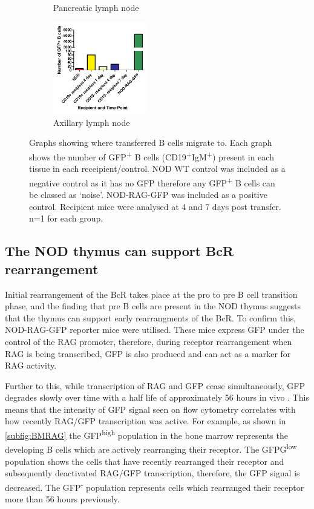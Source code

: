 \begin{figure}
\begin{subfigure}{0.45\textwidth}
	\caption{Pancreatic lymph node}
	\label{subfig:PLNGFPBcells}
	\end{subfigure}
	\begin{subfigure}{\textwidth}
	\centering
	\includegraphics[width=0.45\textwidth]{Figures/axLNGFPBcells.pdf}
	\caption{Axillary lymph node}
	\label{subfig:axLNGFPBcells}
	\end{subfigure}
\caption[Transferred B cells migrate preferentially to the spleen and thymus]{Graphs showing where transferred B cells migrate to.
Each graph shows the number of GFP\textsuperscript{+} B cells (CD19\textsuperscript{+}IgM\textsuperscript{+}) present in each tissue in each receipient/control. NOD WT control was included as a negative control as it has no GFP therefore any GFP\textsuperscript{+} B cells can be classed as `noise'. 
NOD-RAG-GFP was included as a positive control. 
Recipient mice were analysed at 4 and 7 days post transfer. n=1 for each group.}
\label{fig:GFPBcellgraphs}
\end{figure}

\subsection{The NOD thymus can support BcR rearrangement}

Initial rearrangement of the BcR takes place at the pro to pre B cell transition phase, and the finding that pre B cells are present in the NOD thymus suggests that the thymus can support early rearrangments of the BcR.
To confirm this, NOD-RAG-GFP reporter mice were utilised.
These mice express GFP under the control of the RAG promoter, therefore, during receptor rearrangement when RAG is being transcribed, GFP is also produced and can act as a marker for RAG activity.

Further to this, while transcription of RAG and GFP cease simultaneously, GFP degrades slowly over time with a half life of approximately 56 hours in vivo \citep{McCaughtry2007}.
This means that the intensity of GFP signal seen on flow cytometry correlates with how recently RAG/GFP transcription was active.
For example, as shown in \cref{subfig:BMRAG} the GFP\textsuperscript{high} population in the bone marrow represents the developing B cells which are actively rearranging their receptor.
The GFPG\textsuperscript{low} population shows the cells that have recently rearranged their receptor and subsequently deactivated RAG/GFP transcription, therefore, the GFP signal is decreased.
The GFP\textsuperscript{-} population represents cells which rearranged their receptor more than 56 hours previously.

